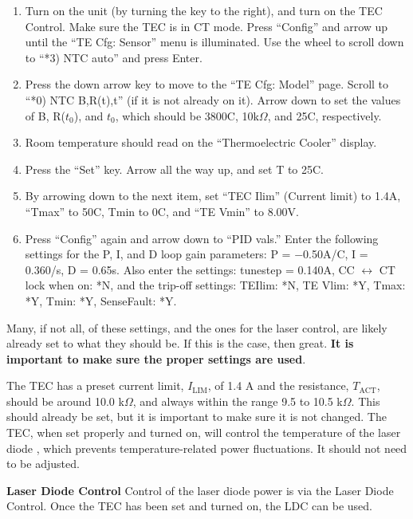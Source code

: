 \documentclass{../lab}
\begin{document}
\begin{enumerate}
    \item Turn on the unit (by turning the key to the right), and turn on the TEC Control. Make sure the TEC is in CT mode. Press ``Config'' and arrow up until the ``TE Cfg: Sensor'' menu is illuminated. Use the wheel to scroll down to ``*3) NTC auto'' and press Enter.

    \item Press the down arrow key to move to the ``TE Cfg: Model'' page. Scroll to ``*0) NTC B,R(t),t'' (if it is not already on it). Arrow down to set the values of Β, R($t_0$), and $t_0$, which should be 3800C, 10k$\Omega$, and 25C, respectively.

    \item Room temperature should read on the ``Thermoelectric Cooler'' display.

    \item Press the ``Set'' key. Arrow all the way up, and set T to 25C.

    \item By arrowing down to the next item, set ``TEC Ilim'' (Current limit) to 1.4A, ``Tmax'' to 50C, Tmin to 0C, and ``TE Vmin'' to 8.00V.

    \item Press ``Config'' again and arrow down to ``PID vals.'' Enter the following settings for the P, I, and D loop gain parameters: P = $-$0.50A/C, I = 0.360/s, D = 0.65s. Also enter the settings: tunestep = 0.140A, CC $\leftrightarrow$ CT lock when on: *N, and the trip-off settings: TEIlim: *N, TE Vlim: *Y, Tmax: *Y, Tmin: *Y, SenseFault: *Y.
\end{enumerate}

Many, if not all, of these settings, and the ones for the laser control, are likely already set to what they should be. If this is the case, then great. \textbf{It is important to make sure the proper settings are used}.

The TEC has a preset current limit, $I_\text{LIM}$, of 1.4 A and the resistance, $T_\text{ACT}$, should be around 10.0 k$\Omega$, and always within the range 9.5 to 10.5 k$\Omega$. This should already be set, but it is important to make sure it is not changed. The TEC, when set properly and turned on, will control the temperature of the laser diode , which prevents temperature-related power fluctuations. It should not need to be adjusted.

\textbf{Laser Diode Control} Control of the laser diode power is via the Laser Diode Control. Once the TEC has been set and turned on, the LDC can be used.
\end{document}
